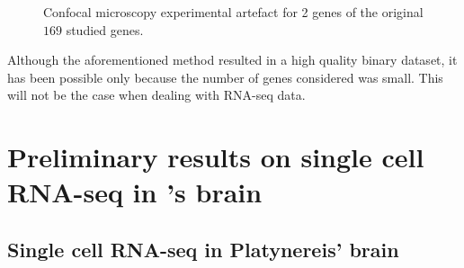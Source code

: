 \begin{figure}[h]
        \myfloatalign
         \quad
        \caption{Confocal microscopy experimental artefact for 2 genes of the original $169$ studied genes.}\label{fig:artefact}
\end{figure}
	
	Although the aforementioned method resulted in a high quality binary dataset, it has been possible only because the number of genes considered was small. This will not be the case when dealing with RNA-seq data.
	
\section{Preliminary results on single cell RNA-seq in \platy{}'s brain}\label{sec:back_mapping_platy}
  \subsection{Single cell RNA-seq in Platynereis' brain}
  
